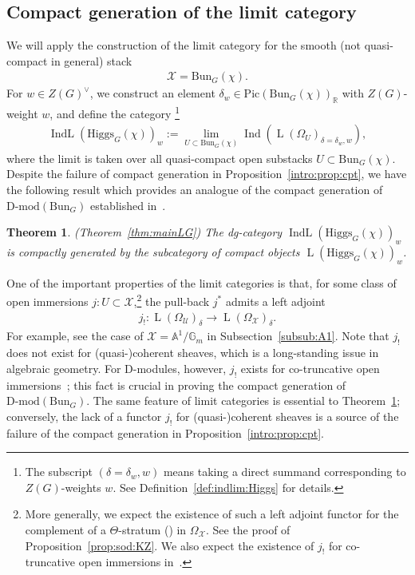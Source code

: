 \documentclass [11pt,oneside,a4paper,mathscr]{amsart}
\newtheorem{thm}{Theorem}[section]
\theoremstyle{definition}
\newcommand{\LL}{\operatorname{L}}
\newcommand{\X}{\mathcal{X}}
\newcommand{\Ind}{\operatorname{Ind}}
\newcommand{\IndL}{\operatorname{IndL}}
\newcommand{\Hig}{\mathrm{Higgs}}
\newcommand{\Bun}{\mathrm{Bun}}
\begin{document}
\subsection{Compact generation of the limit category}\label{subsec:compactgeneration}
We will apply the construction of the limit category 
for the smooth (not quasi-compact in general) stack 
\begin{align*}\X=\Bun_G(\chi).
\end{align*}
For $w\in Z(G)^{\vee}$, we construct an element $\delta_w \in \mathrm{Pic}(\Bun_G(\chi))_{\mathbb{R}}$ with $Z(G)$-weight $w$, and define the category
\footnote{The subscript $(\delta=\delta_w, w)$ means taking a direct summand corresponding to $Z(G)$-weights $w$. See Definition~\ref{def:indlim:Higgs} for details.} \begin{align*}%
\IndL(\Hig_G(\chi))_w := \lim_{U \subset \Bun_{G}(\chi)} \Ind(\LL(\Omega_{U})_{\delta = \delta_w, w}), \end{align*} where the limit is taken over all quasi-compact open substacks $U \subset \Bun_G(\chi)$.
Despite the failure of compact generation in Proposition~\ref{intro:prop:cpt}, we have the following result
which provides an analogue of the compact generation of $\text{D-mod}(\Bun_G)$ established in~\cite{DGbun}.

\begin{thm}\label{intro:thm:gen}\emph{(Theorem~\ref{thm:mainLG})}
The dg-category $\IndL(\Hig_G(\chi))_w$ is compactly generated
by the subcategory of compact objects $\LL(\Hig_G(\chi))_w$. 
\end{thm}


One of the important properties of the limit categories is that, 
for some class of open immersions $j \colon U \subset \X$,\footnote{More generally, we expect the existence of such a left adjoint functor for the complement of a
$\Theta$-stratum (\cite{HalpTheta}) in $\Omega_{\X}$. See the proof of Proposition~\ref{prop:sod:KZ}. We also expect the existence of $j_!$ for co-truncative open immersions in~\cite{DGbun}.} 
the pull-back $j^*$ admits a left adjoint
\begin{align}\label{eq:jlowershriek}
    j_{!} \colon \LL(\Omega_{\mathcal{U}})_{\delta} \to \LL(\Omega_{\X})_{\delta}.
\end{align}
For example, see the case of $\X=\mathbb{A}^1/\mathbb{G}_m$ in Subsection~\ref{subsub:A1}.
Note that $j_{!}$ does not exist for (quasi-)coherent sheaves, which is a long-standing issue in algebraic geometry. For D-modules, however, $j_{!}$ exists for co-truncative open 
immersions~\cite{DGbun}; this fact is crucial in proving the compact generation of $\text{D-mod}(\Bun_G)$. The same feature of limit categories is essential to Theorem~\ref{intro:thm:gen}; conversely, the lack of a functor $j_{!}$ for (quasi-)coherent sheaves is a source of the failure of the compact generation in Proposition~\ref{intro:prop:cpt}. 
\end{document}
